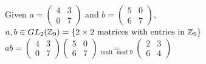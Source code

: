 \begin{example}
Given $a=\left(\begin{matrix}
4 & 3 \\
0 & 7
\end{matrix}\right)$ and $b=\left(\begin{matrix}
5 & 0 \\
6 & 7
\end{matrix}\right)$, $a,b\in GL_2({\mathbb{Z}}_9)=\{2\times 2 \text{ matrices with entries in }{\mathbb{Z}}_9\}$\\
$ab=\left(\begin{matrix}
4 & 3 \\
0 & 7
\end{matrix}\right)\left(\begin{matrix}
5 & 0 \\
6 & 7
\end{matrix}\right)\underset{\text{mult. mod 9}}{=}\left(\begin{matrix}
2 & 3 \\
6 & 4
\end{matrix}\right)$\steezybreak

\end{example}

